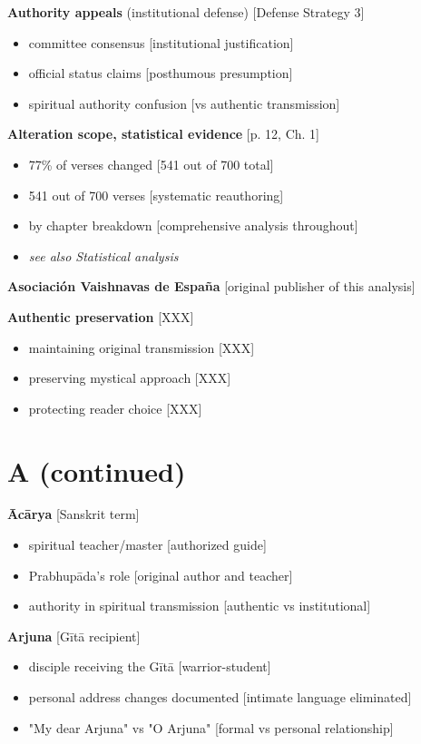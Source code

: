 \documentclass[11pt,twoside]{book}
\begin{document}
\textbf{\textbf{Authority appeals}} (institutional defense) [Defense Strategy 3]
\begin{itemize}
\item committee consensus [institutional justification]
\item official status claims [posthumous presumption]
\item spiritual authority confusion [vs authentic transmission]
\end{itemize}

\textbf{\textbf{Alteration scope, statistical evidence}} {[}p. 12, Ch. 1]
\begin{itemize}
\item 77\% of verses changed [541 out of 700 total]
\item 541 out of 700 verses [systematic reauthoring]
\item by chapter breakdown [comprehensive analysis throughout]
\item \emph{see also Statistical analysis}
\end{itemize}

\textbf{\textbf{Asociación Vaishnavas de España}} {[}original publisher of this analysis]

\textbf{\textbf{Authentic preservation}} {[}XXX]
\begin{itemize}
\item maintaining original transmission [XXX]
\item preserving mystical approach [XXX]
\item protecting reader choice [XXX]
\end{itemize}
\section*{A (continued)}
\label{sec:org68748b9}

\textbf{\textbf{Ācārya}} {[}Sanskrit term]
\begin{itemize}
\item spiritual teacher/master [authorized guide]
\item Prabhupāda's role [original author and teacher]
\item authority in spiritual transmission [authentic vs institutional]
\end{itemize}

\textbf{\textbf{Arjuna}} {[}Gītā recipient]
\begin{itemize}
\item disciple receiving the Gītā [warrior-student]
\item personal address changes documented [intimate language eliminated]
\item "My dear Arjuna" vs "O Arjuna" [formal vs personal relationship]
\end{itemize}
\end{document}
